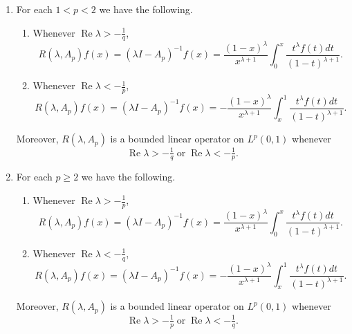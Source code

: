 \documentclass[10pt,a4paper]{amsart}
\renewcommand{\Re}[1]{\operatorname{Re} #1 }
\renewcommand{\geq}{\geqslant}
\begin{document}
\begin{Theorem}\label{rrrrAAp}
\hfill
\begin{enumerate}
\item For each $1 < p < 2$ we have the following.
\begin{enumerate}
\item Whenever $\Re \lambda> -\frac{1}{q}$,
\begin{equation}\label{aone}
 R(\lambda,A_p)f(x)=(\lambda I-A_p)^{-1}f(x)=\frac{(1-x)^{\lambda}}{x^{\lambda+1}}\int_{0}^{x}\frac{t^{\lambda}f(t)dt}{(1-t)^{\lambda+1}}.
 \end{equation}
\item Whenever $\Re \lambda<-\frac{1}{p}$,
\begin{equation}\label{atwo}
 R(\lambda,A_p)f(x)=(\lambda I-A_p)^{-1}f(x)=-\frac{(1-x)^{\lambda}}{x^{\lambda+1}}\int_{x}^{1}\frac{t^{\lambda}f(t)dt}{(1-t)^{\lambda+1}}.
 \end{equation}
  \end{enumerate}
 Moreover, $R(\lambda,A_p)$ is a bounded linear operator on $L^{p}(0,1)$ whenever 
$$ \Re \lambda > -\tfrac{1}{q} \; \mbox{or} \; \Re \lambda < -\tfrac{1}{p}.$$
\item For each  $p \geq 2$ we have the following.
\begin{enumerate}
\item Whenever $\Re \lambda > -\frac{1}{p}$, 
\begin{equation}\label{bone}
 R(\lambda,A_p)f(x)=(\lambda I-A_p)^{-1}f(x)=\frac{(1-x)^{\lambda}}{x^{\lambda+1}}\int_{0}^{x}\frac{t^{\lambda}f(t)dt}{(1-t)^{\lambda+1}}.
 \end{equation}
 \item Whenever $\Re \lambda < -\frac{1}{q}$, 
 \begin{equation}\label{btwo}
  R(\lambda,A_p)f(x)=(\lambda I-A_p)^{-1}f(x)=-\frac{(1-x)^{\lambda}}{x^{\lambda+1}}\int_{x}^{1}\frac{t^{\lambda}f(t)dt}{(1-t)^{\lambda+1}}.
  \end{equation}
\end{enumerate}
   Moreover, $R(\lambda,A_p)$ is a bounded linear operator on $L^{p}(0,1)$ whenever 
$$\Re \lambda > -\tfrac{1}{p} \; \mbox{or} \; \Re \lambda < -\tfrac{1}{q}.$$
\end{enumerate}
\end{Theorem}
\end{document}
